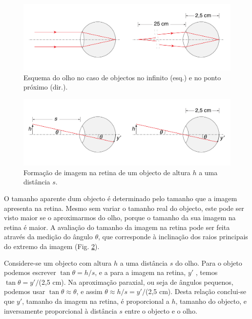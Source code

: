 \documentclass[a4paper,12pt]{article}      %
\begin{document}
\begin{figure}
	[!htb]  \centering 
	\includegraphics[width=1.0\textwidth]{olho-2}
	\caption{Esquema do olho no caso de objectos no infinito (esq.) e no ponto próximo (dir.). \label{fig:olho-2}} 
\end{figure}
\begin{figure}
	[!htb]  \centering 
	\includegraphics[width=1.0\textwidth]{olho-3}
	\caption{Formação de imagem na retina de um objecto de altura $h$ a uma distância $s$. \label{fig:olho-3}} 
\end{figure}

O tamanho aparente dum objecto é determinado pelo tamanho que a imagem apresenta na retina. Mesmo sem variar o tamanho real do objecto, este pode ser visto maior se o aproximarmos do olho, porque o tamanho da sua imagem na retina é maior. A avaliação do tamanho da imagem na retina pode ser feita através da medição do ângulo $\theta$, que corresponde à inclinação dos raios principais do extremo da imagem (Fig. \ref{fig:olho-3}).

Considere-se um objecto com altura $h$ a uma distância $s$ do olho. Para o objeto podemos escrever $\tan\theta=h/s$, e a para a imagem na retina, $y'$ , temos $\tan\theta = y' /$(2,5 cm). Na aproximação paraxial, ou seja de ângulos pequenos, podemos usar $\tan\theta \approx\theta$, e assim $\theta\approx h/s=y'/$(2,5 cm). Desta relação conclui-se que $y'$, tamanho da imagem na retina, é proporcional a $h$, tamanho do objecto, e inversamente proporcional à distância $s$ entre o objecto e o olho.
\end{document}
